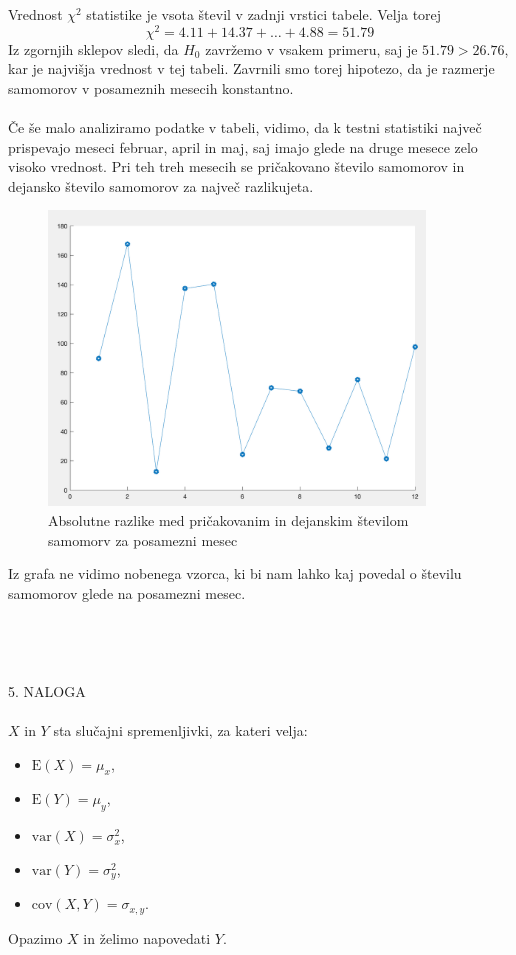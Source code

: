 \documentclass[a4paper,12pt]{article}
\begin{document}
\noindent
Vrednost $\chi^2$ statistike je vsota števil v zadnji vrstici tabele. Velja torej
$$ \chi^2 = 4.11 + 14.37 + \ldots + 4.88 = 51.79 $$
Iz zgornjih sklepov sledi, da $H_0$ zavržemo v vsakem primeru, saj je $51.79 > 26.76$, kar je najvišja vrednost v tej tabeli. Zavrnili smo torej hipotezo, da je razmerje samomorov v posameznih mesecih konstantno.
\\
\\
Če še malo analiziramo podatke v tabeli, vidimo, da k testni statistiki največ prispevajo meseci februar, april in maj, saj imajo glede na druge mesece zelo visoko vrednost. Pri teh treh mesecih se pričakovano število samomorov in dejansko število samomorov za največ razlikujeta.
\\
\begin{figure}[ht!]
    \centering
    \includegraphics[width=100mm]{razp.png}
    \caption{Absolutne razlike med pričakovanim in dejanskim številom samomorv za posamezni mesec}
\end{figure}

\noindent
Iz grafa ne vidimo nobenega vzorca, ki bi nam lahko kaj povedal o številu samomorov glede na posamezni mesec.
\\
\\
\\
\\
\\

\noindent
\textsc{\large{5. NALOGA}}
\\
\\
$X$ in $Y$ sta slučajni spremenljivki, za kateri velja:
\begin{itemize} 
    \item $\text{E}(X) = \mu_x$,
    \item $\text{E}(Y) = \mu_y$,
    \item $\text{var}(X) = \sigma_x^2$,
    \item $\text{var}(Y) = \sigma_y^2$,
    \item $\text{cov}(X,Y) = \sigma_{x,y}$.
\end{itemize}
Opazimo $X$ in želimo napovedati $Y$. 
\\
\end{document}
